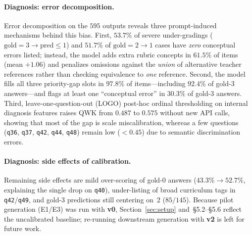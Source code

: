 \documentclass[11pt]{article}
\begin{document}
\paragraph{Diagnosis: error decomposition.} Error decomposition on the $595$ outputs reveals three prompt-induced mechanisms behind this bias. First, $53.7\%$ of severe under-gradings ($\text{gold}{=}3 \to \text{pred}\le 1$) and $51.7\%$ of $\text{gold}{=}2 \to 1$ cases have \emph{zero} conceptual errors listed; instead, the model adds extra rubric concepts in $61.5\%$ of items (mean $+1.06$) and penalizes omissions against the \emph{union} of alternative teacher references rather than checking equivalence to \emph{one} reference. Second, the model fills all three priority-gap slots in $97.8\%$ of items---including $92.4\%$ of gold-$3$ answers---and flags at least one ``conceptual error'' in $30.3\%$ of gold-$3$ answers. Third, leave-one-question-out (LOGO) post-hoc ordinal thresholding on internal diagnosis features raises QWK from $0.487$ to $0.575$ without new API calls, showing that most of the gap is scale miscalibration, whereas a few questions (\texttt{q36}, \texttt{q37}, \texttt{q42}, \texttt{q44}, \texttt{q48}) remain low ($<0.45$) due to semantic discrimination errors.

\paragraph{Diagnosis: side effects of calibration.} Remaining side effects are mild over-scoring of gold-$0$ answers ($43.3\% \to 52.7\%$, explaining the single drop on \texttt{q40}), under-listing of broad curriculum tags in \texttt{q42}/\texttt{q49}, and gold-$3$ predictions still centering on~$2$ ($85/145$). Because pilot generation (E1/E3) was run with \textbf{v0}, Section~\ref{sec:setup} and~\S5.2--\S5.6 reflect the uncalibrated baseline; re-running downstream generation with \textbf{v2} is left for future work.
\end{document}
